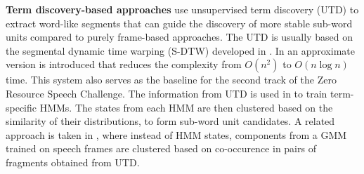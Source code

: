 \textbf{Term discovery-based approaches} %
 use unsupervised term discovery (UTD) to extract word-like segments that can guide the discovery of more stable sub-word units compared to purely frame-based approaches.
The UTD is usually based on the segmental dynamic time warping (S-DTW) developed in \parencite{park2008unsupervised}.
In \parencite{jansen2011efficient} an approximate version is introduced that reduces the complexity from $O(n^2)$ to $O(n \log n)$ time.
This system also serves as the baseline for the second track of the Zero Resource Speech Challenge. %
The information from UTD is used in \parencite{jansen2011towards} to train term-specific HMMs.
The states from each HMM are then clustered based on the similarity of their distributions, to form sub-word unit candidates.
A related approach is taken in \parencite{jansen2013weak}, where instead of HMM states, components from a GMM trained on speech frames are clustered based on co-occurence in pairs of fragments obtained from UTD. %
